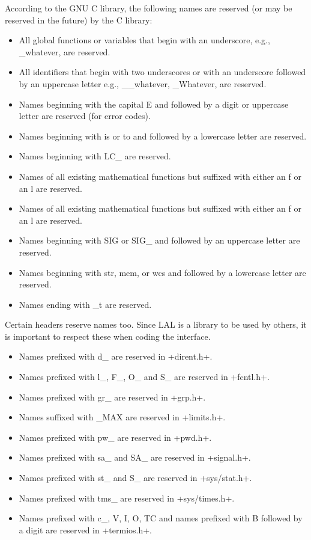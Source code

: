 \documentclass[10pt]{ligodcc}
\makeatletter
\def\verb{\relax\ifmmode\hbox\else\leavevmode\null\fi
  \bgroup
    \color{blue}\small
    \verb@eol@error \let\do\@makeother \dospecials
    \verbatim@font\@noligs
    \@ifstar\@sverb\@verb}
\renewcommand{\texttt}[1]{{\ttfamily\color{blue}#1}}
\makeatother
\begin{document}
According to the GNU C library, the following names are reserved (or may be
reserved in the future) by the C library:
\begin{itemize}
\item All global functions or variables that begin with an underscore,
e.g., \texttt{\_whatever}, are reserved.
\item All identifiers that begin with two underscores or with an underscore
followed by an uppercase letter
e.g., \texttt{\_\_whatever}, \texttt{\_Whatever}, are reserved.
\item Names beginning with the capital \texttt{E} and followed by a digit
or uppercase letter are reserved (for error codes).
\item Names beginning with \texttt{is} or \texttt{to} and followed by a
lowercase letter are reserved.
\item Names beginning with \texttt{LC\_} are reserved.
\item Names of all existing mathematical functions but suffixed with either
an \texttt{f} or an \texttt{l} are reserved.
\item Names of all existing mathematical functions but suffixed with either
an \texttt{f} or an \texttt{l} are reserved.
\item Names beginning with \texttt{SIG} or \texttt{SIG\_} and followed by
an uppercase letter are reserved.
\item Names beginning with \texttt{str}, \texttt{mem}, or \texttt{wcs} and
followed by a lowercase letter are reserved.
\item Names ending with \texttt{\_t} are reserved.
\end{itemize}

Certain headers reserve names too.  Since LAL is a library to be used by
others, it is important to respect these when coding the interface.
\begin{itemize}
\item Names prefixed with \texttt{d\_} are reserved in \verb+dirent.h+.
\item Names prefixed with \texttt{l\_}, \texttt{F\_}, \texttt{O\_} and
\texttt{S\_} are reserved in \verb+fcntl.h+.
\item Names prefixed with \texttt{gr\_} are reserved in \verb+grp.h+.
\item Names suffixed with \texttt{\_MAX} are reserved in \verb+limits.h+.
\item Names prefixed with \texttt{pw\_} are reserved in \verb+pwd.h+.
\item Names prefixed with \texttt{sa\_} and \texttt{SA\_} are reserved 
in \verb+signal.h+.
\item Names prefixed with \texttt{st\_} and \texttt{S\_} are reserved in
\verb+sys/stat.h+.
\item Names prefixed with \texttt{tms\_} are reserved in \verb+sys/times.h+.
\item Names prefixed with \texttt{c\_}, \texttt{V}, \texttt{I}, \texttt{O},
\texttt{TC} and names prefixed with \texttt{B} followed by a digit are reserved
in \verb+termios.h+.
\end{itemize}
\end{document}

